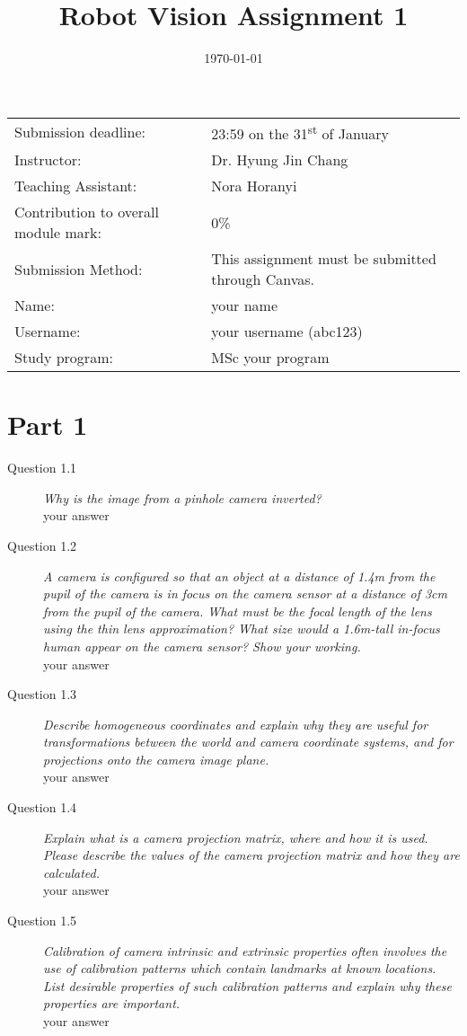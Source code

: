 \documentclass[a4paper, oneside]{article}
\newcommand\st{\textsuperscript{st}\xspace}
\newcommand{\assignment}[0]{assignment\xspace}
\newcommand{\Assignment}[0]{Assignment\xspace}
\begin{document}
	\title{Robot Vision \Assignment 1}
	\date{\today}
	
	\maketitle
	\begin{tabularx}{\textwidth}{lX}
		Submission deadline: & 23:59 on the 31\st of January\\
		Instructor: & Dr. Hyung Jin Chang\\
		Teaching Assistant: & Nora Horanyi\\		
		Contribution to overall module mark: & 0\%\\
		Submission Method: & This \assignment must be submitted through Canvas.\\
		\addlinespace[1cm]
		Name: & your name\\
		Username: & your username (abc123)\\		
		Study program: &  MSc your program\\
	\end{tabularx}
	\section*{Part 1}
	\begin{description}		
		\item[Question 1.1 ] \emph{Why is the image from a pinhole camera inverted? }
		\\your answer
		\item[Question 1.2 ] \emph{A camera is configured so that an object at a distance of 1.4m from the pupil of the camera is in focus on the camera sensor at a distance of 3cm from the pupil of the camera. What must be the focal length of the lens using the thin lens approximation? What size would a 1.6m-tall in-focus human appear on the camera sensor? Show your working.}
		\\your answer
		\item[Question 1.3 ] \emph{Describe homogeneous coordinates and explain why they are useful for transformations between the world and camera coordinate systems, and for projections onto the camera image plane.}
		\\your answer
	    \item[Question 1.4 ] \emph{Explain what is a camera projection matrix, where and how it is used. Please describe the values of the camera projection matrix and how they are calculated.}
	    \\your answer
		\item[Question 1.5 ] \emph{Calibration of camera intrinsic and extrinsic properties often involves the use of calibration patterns which contain landmarks at known locations. List desirable properties of such calibration patterns and explain why these properties are important.}
		\\your answer

	\end{description}
	
\end{document}

